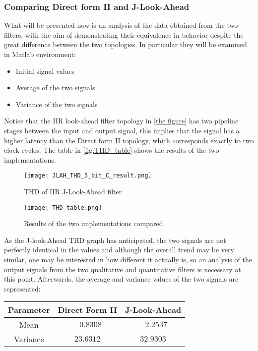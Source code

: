 \subsubsection{Comparing Direct form II and J-Look-Ahead}
What will be presented now is an analysis of the data obtained from the two filters, with the aim of demonstrating their equivalence in behavior despite the great difference between the two topologies. In particular they will be examined in Matlab environment:

\begin{itemize}
	\item Initial signal values
	\item Average of the two signals
	\item Variance of the two signals
\end{itemize}

Notice that the IIR look-ahead filter topology in \autoref{the figure} has two pipeline stages between the input and output signal, this implies that the signal has a higher latency than the Direct form II topology, which corresponds exactly to two clock cycles. The table in \autoref{fig:THD_table} shows the results of the two implementations.

\begin{figure}[ht]
	\begin{minipage}[b]{0.5\linewidth}
		\centering
		\texttt{[image: JLAH\_THD\_5\_bit\_C\_result.png]}
		\caption{THD of IIR J-Look-Ahead filter}
		\label{fig:THD_5_bit_IIR_JLA}
	\end{minipage}
	\hspace{0.5cm}
	\begin{minipage}[b]{0.4\linewidth}
		\centering
		\texttt{[image: THD\_table.png]}
		\caption{Results of the two implementations compared}
		\label{fig:THD_table}
	\end{minipage}
\end{figure}

As the J-look-Ahead {THD} graph has anticipated, the two signals are not perfectly identical in the values and although the overall trend may be very similar, one may be interested in how different it actually is, so an analysis of the output signals from the two qualitative and quantitative filters is necessary at this point. Afterwards, the average and variance values of the two signals are represented:

\begin{table}[H]
	\begin{center}
		\begin{tabular}{|c|c|c|}
			\hline
			Parameter		& Direct Form II	& J-Look-Ahead 			\\ \hline
			Mean			&$-0.8308$  		& $-2.2537$	           	\\ \hline
			Variance		&$23.6312$      	& $32.9303$             \\ \hline
			
		\end{tabular}
	\end{center}
\end{table}

